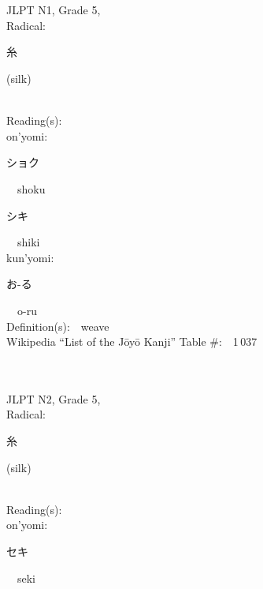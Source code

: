 \begin{multicols}{2}
\ \ \\
{\fontsize{34pt}{40pt}  }\ \ \\  %
{JLPT N1, Grade 5, \\Radical:\ \ {\begin{CJK}{UTF8}{min} 糸 \end{CJK}} (silk) } \\
Reading(s):\ \ \\
{\hspace*{1em}}on'yomi:\ \ \\
{\hspace*{2em}}{\begin{CJK}{UTF8}{min} ショク \end{CJK}}\ \ shoku\ \ \\
{\hspace*{2em}}{\begin{CJK}{UTF8}{min} シキ \end{CJK}}\ \ shiki\ \ \\
{\hspace*{1em}}kun'yomi:\ \ \\
{\hspace*{2em}}{\begin{CJK}{UTF8}{min} お-る \end{CJK}}\ \ o-ru\ \ \\
Definition(s):\ \ weave \\
Wikipedia ``List of the J\=oy\=o Kanji'' Table \#:\ \ 1\,037 \\
\ \ \\
{\fontsize{34pt}{40pt}  }\ \ \\  %
{JLPT N2, Grade 5, \\Radical:\ \ {\begin{CJK}{UTF8}{min} 糸 \end{CJK}} (silk) } \\
Reading(s):\ \ \\
{\hspace*{1em}}on'yomi:\ \ \\
{\hspace*{2em}}{\begin{CJK}{UTF8}{min} セキ \end{CJK}}\ \ seki\ \ \\

\end{multicols}
